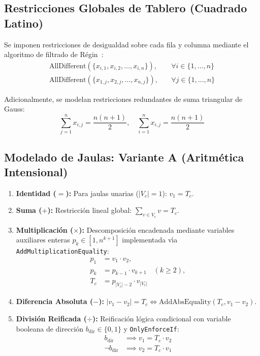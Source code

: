 \documentclass[conference]{IEEEtran}
\begin{document}
\subsection{Restricciones Globales de Tablero (Cuadrado Latino)}
Se imponen restricciones de desigualdad sobre cada fila y columna mediante el algoritmo de filtrado de R\'egin~\cite{regin1994filtering}:
\begin{align}
    \text{AllDifferent}(\{x_{i,1}, x_{i,2}, \dots, x_{i,n}\}), & \quad \forall i \in \{1, \dots, n\} \label{eq:alldiff_row} \\
    \text{AllDifferent}(\{x_{1,j}, x_{2,j}, \dots, x_{n,j}\}), & \quad \forall j \in \{1, \dots, n\} \label{eq:alldiff_col}
\end{align}

Adicionalmente, se modelan restricciones redundantes de suma triangular de Gauss:
\begin{equation}
    \sum_{j=1}^n x_{i,j} = \frac{n(n+1)}{2}, \quad \sum_{i=1}^n x_{i,j} = \frac{n(n+1)}{2}
    \label{eq:redundant_sum}
\end{equation}

\subsection{Modelado de Jaulas: Variante A (Aritm\'etica Intensional)}
\begin{enumerate}
    \item \textbf{Identidad ($=$):} Para jaulas unarias ($|V_c| = 1$): $v_1 = T_c$.
    \item \textbf{Suma ($+$):} Restricci\'on lineal global: $\sum_{v \in V_c} v = T_c$.
    \item \textbf{Multiplicaci\'on ($\times$):} Descomposici\'on encadenada mediante variables auxiliares enteras $p_k \in [1, n^{k+1}]$ implementada v\'{\i}a \texttt{AddMultiplicationEquality}:
    \begin{equation}
    \begin{aligned}
        p_1 &= v_1 \cdot v_2, \\
        p_k &= p_{k-1} \cdot v_{k+1} \quad (k \ge 2), \\
        T_c &= p_{|V_c|-2} \cdot v_{|V_c|}
    \end{aligned}
    \end{equation}
    \item \textbf{Diferencia Absoluta ($-$):} $|v_1 - v_2| = T_c \iff \text{AddAbsEquality}(T_c, v_1 - v_2)$.
    \item \textbf{Divisi\'on Reificada ($\div$):} Reificaci\'on l\'ogica condicional con variable booleana de direcci\'on $b_{\text{dir}} \in \{0, 1\}$ y \texttt{OnlyEnforceIf}:
    \begin{align}
        b_{\text{dir}} &\implies v_1 = T_c \cdot v_2 \label{eq:div_reif_1} \\
        \neg b_{\text{dir}} &\implies v_2 = T_c \cdot v_1 \label{eq:div_reif_2}
    \end{align}
\end{enumerate}
\end{document}
